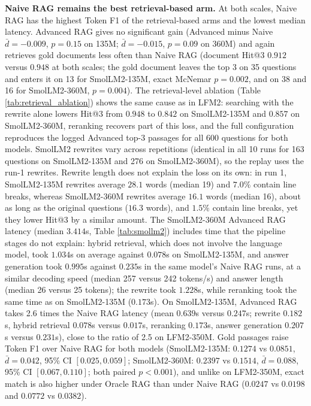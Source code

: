 \documentclass[10pt]{article}
\begin{document}
\textbf{Naive RAG remains the best retrieval-based arm.} At both scales, Naive RAG has the highest Token F1 of the retrieval-based arms and the lowest median latency. Advanced RAG gives no significant gain (Advanced minus Naive $\bar{d}=-0.009$, $p=0.15$ on 135M; $\bar{d}=-0.015$, $p=0.09$ on 360M) and again retrieves gold documents less often than Naive RAG (document Hit@3 $0.912$ versus $0.948$ at both scales; the gold document leaves the top 3 on 35 questions and enters it on 13 for SmolLM2-135M, exact McNemar $p=0.002$, and on 38 and 16 for SmolLM2-360M, $p=0.004$). The retrieval-level ablation (Table \ref{tab:retrieval_ablation}) shows the same cause as in LFM2: searching with the rewrite alone lowers Hit@3 from $0.948$ to $0.842$ on SmolLM2-135M and $0.857$ on SmolLM2-360M, reranking recovers part of this loss, and the full configuration reproduces the logged Advanced top-3 passages for all 600 questions for both models. SmolLM2 rewrites vary across repetitions (identical in all 10 runs for 163 questions on SmolLM2-135M and 276 on SmolLM2-360M), so the replay uses the run-1 rewrites. Rewrite length does not explain the loss on its own: in run 1, SmolLM2-135M rewrites average $28.1$ words (median 19) and $7.0\%$ contain line breaks, whereas SmolLM2-360M rewrites average $16.1$ words (median 16), about as long as the original questions ($16.3$ words), and $1.5\%$ contain line breaks, yet they lower Hit@3 by a similar amount. The SmolLM2-360M Advanced RAG latency (median $3.414$s, Table \ref{tab:smollm2}) includes time that the pipeline stages do not explain: hybrid retrieval, which does not involve the language model, took $1.034$s on average against $0.078$s on SmolLM2-135M, and answer generation took $0.995$s against $0.235$s in the same model's Naive RAG runs, at a similar decoding speed (median 257 versus 242 tokens/s) and answer length (median 26 versus 25 tokens); the rewrite took $1.228$s, while reranking took the same time as on SmolLM2-135M ($0.173$s). On SmolLM2-135M, Advanced RAG takes 2.6 times the Naive RAG latency (mean $0.639$s versus $0.247$s; rewrite $0.182$s, hybrid retrieval $0.078$s versus $0.017$s, reranking $0.173$s, answer generation $0.207$s versus $0.231$s), close to the ratio of 2.5 on LFM2-350M. Gold passages raise Token F1 over Naive RAG for both models (SmolLM2-135M: $0.1274$ vs $0.0851$, $\bar{d}=0.042$, 95\% CI $[0.025, 0.059]$; SmolLM2-360M: $0.2397$ vs $0.1514$, $\bar{d}=0.088$, 95\% CI $[0.067, 0.110]$; both paired $p<0.001$), and unlike on LFM2-350M, exact match is also higher under Oracle RAG than under Naive RAG ($0.0247$ vs $0.0198$ and $0.0772$ vs $0.0382$).
\end{document}
